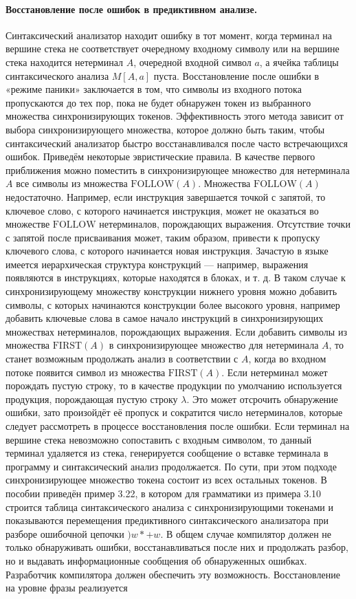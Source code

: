 \documentclass[a4paper,12pt]{article}
\begin{document}
\paragraph{Восстановление после ошибок в предиктивном анализе.}
Синтаксический анализатор находит ошибку в тот момент, когда терминал на вершине стека не соответствует очередному входному символу или на вершине стека находится нетерминал \(A\), очередной входной символ \(a\), а ячейка таблицы синтаксического анализа \(M[A,a]\) пуста. Восстановление после ошибки в «режиме паники» заключается в том, что символы из входного потока пропускаются до тех пор, пока не будет обнаружен токен из выбранного множества синхронизирующих токенов. Эффективность этого метода зависит от выбора синхронизирующего множества, которое должно быть таким, чтобы синтаксический анализатор быстро восстанавливался после часто встречающихся ошибок. Приведём некоторые эвристические правила. В качестве первого приближения можно поместить в синхронизирующее множество для нетерминала \(A\) все символы из множества \(\mathrm{FOLLOW}(A)\). Множества \(\mathrm{FOLLOW}(A)\) недостаточно. Например, если инструкция завершается точкой с запятой, то ключевое слово, с которого начинается инструкция, может не оказаться во множестве \(\mathrm{FOLLOW}\) нетерминалов, порождающих выражения. Отсутствие точки с запятой после присваивания может, таким образом, привести к пропуску ключевого слова, с которого начинается новая инструкция. Зачастую в языке имеется иерархическая структура конструкций — например, выражения появляются в инструкциях, которые находятся в блоках, и т. д. В таком случае к синхронизирующему множеству конструкции нижнего уровня можно добавить символы, с которых начинаются конструкции более высокого уровня, например добавить ключевые слова в самое начало инструкций в синхронизирующих множествах нетерминалов, порождающих выражения. Если добавить символы из множества \(\mathrm{FIRST}(A)\) в синхронизирующее множество для нетерминала \(A\), то станет возможным продолжать анализ в соответствии с \(A\), когда во входном потоке появится символ из множества \(\mathrm{FIRST}(A)\). Если нетерминал может порождать пустую строку, то в качестве продукции по умолчанию используется продукция, порождающая пустую строку \(\lambda\). Это может отсрочить обнаружение ошибки, зато произойдёт её пропуск и сократится число нетерминалов, которые следует рассмотреть в процессе восстановления после ошибки. Если терминал на вершине стека невозможно сопоставить с входным символом, то данный терминал удаляется из стека, генерируется сообщение о вставке терминала в программу и синтаксический анализ продолжается. По сути, при этом подходе синхронизирующее множество токена состоит из всех остальных токенов. В пособии приведён пример 3.22, в котором для грамматики из примера 3.10 строится таблица синтаксического анализа с синхронизирующими токенами и показываются перемещения предиктивного синтаксического анализатора при разборе ошибочной цепочки \()w*+w\). В общем случае компилятор должен не только обнаруживать ошибки, восстанавливаться после них и продолжать разбор, но и выдавать информационные сообщения об обнаруженных ошибках. Разработчик компилятора должен обеспечить эту возможность. Восстановление на уровне фразы реализуется 
\end{document}
